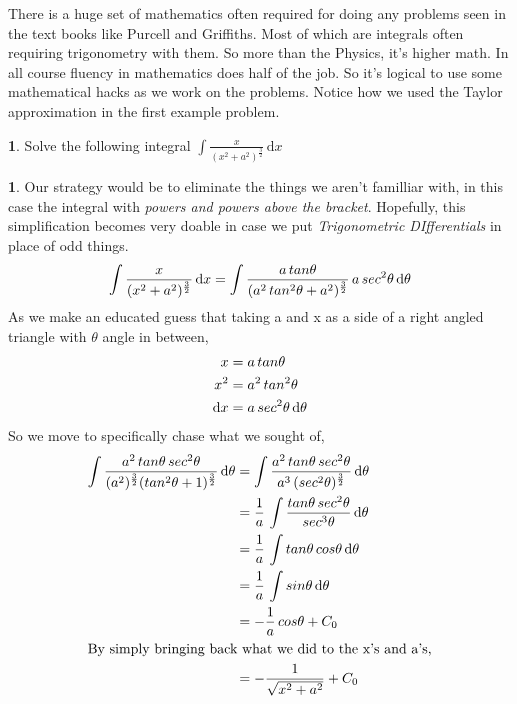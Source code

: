 \documentclass[10pt,letterpaper,twocolumn]{article}
\theoremstyle{definition}
\theoremstyle{definition}
\newtheorem{pr}{\framebox[0.07\textwidth]{Pr}}[section]
\theoremstyle{definition}
\newtheorem{sol}{\framebox[0.07\textwidth]{Sol}}[section]
\begin{document}
There is a huge set of mathematics often required for doing any problems seen in the text books like Purcell and Griffiths. Most of which are integrals often requiring trigonometry with them. So more than the Physics, it's higher math. In all course fluency in mathematics does half of the job. So it's logical to use some mathematical hacks as we work on the problems. Notice how we used the Taylor approximation in the first example problem.

\begin{pr}
 Solve the following integral $\int\frac{x}{(x^2+a^2)^{\frac{3}{2}}}\, \mathrm{d}x  $
\end{pr}
\begin{sol}
Our strategy would be to eliminate the things we aren't familliar with, in this case the integral with \emph{powers and powers above the bracket}. Hopefully, this simplification becomes very doable in case we put \emph{Trigonometric DIfferentials} in place of odd things.
\begin{align}
\int\frac{x}{(x^2+a^2)^ {\frac{3}{2}}} \, \mathrm{d}x \notag = \int\frac{a\,tan\theta}{ (a^2\, tan^2\theta + a^2)^ {\frac{3}{2}} } \, a\, sec^2\theta \,\mathrm{d}\theta
\end{align}
As we make an educated guess that taking a and x as a side of a right angled triangle with $\theta$ angle in between,
\begin{align}
x & = a \, tan\theta  \notag \\
 x^2 & = a^2 \, tan^2\theta  \notag \\
 \mathrm{d}x& = a \,sec^2 \theta\, \mathrm{d}\theta \notag
\end{align}
So we move to specifically chase what we sought of,\\
\begin{align}
\int \frac{a^2 \, tan\theta \,sec^2\theta}
    		{ (a^2)^{\frac{3}{2}} (tan^2\theta + 1)^{\frac{3}{2}} } \, \mathrm{d}\theta	\notag 
&=\int \frac{a^2 \, tan\theta \,sec^2\theta}
			{a^3 \, (sec^2\theta)^ {\frac{3}{2}} }	\, \mathrm{d}\theta	\notag \\
&= \frac{1}{a} \, \int \frac{tan\theta \, sec^2\theta}
								{sec^3\theta} \,\mathrm{d}\theta		\notag \\
&= \frac{1}{a} \, \int tan\theta \, cos\theta 	\, \mathrm{d}\theta \notag \\
%
&=\frac{1}{a} \, \int sin\theta \, \mathrm{d}\theta \notag	\\
&= - \frac{1}{a} \, cos\theta + C_0 \\
\intertext{By simply bringing back what we did to the x's and a's,}
&= - \frac{1}{\sqrt{x^2 + a^2}} + C_0 \notag
\end{align}
\end{sol}
\end{document}
